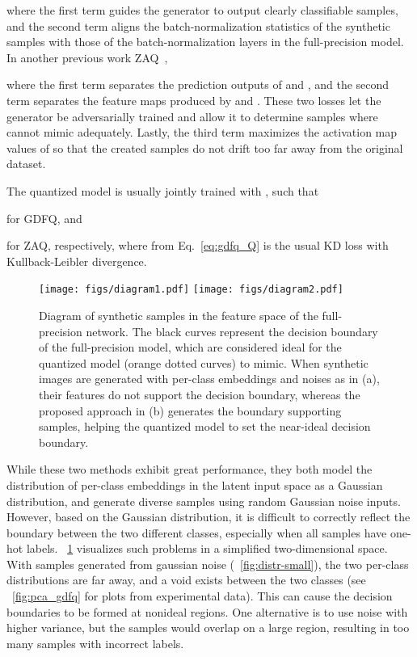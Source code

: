 \documentclass{article}
\begin{document}
where the first term  guides the generator to output clearly classifiable samples, and the second term  aligns the batch-normalization statistics of the synthetic samples with those of the batch-normalization layers in the full-precision model.
In another previous work ZAQ~\cite{zaq},  

where the first term  separates the prediction outputs of  and , and the second term  separates the feature maps produced by  and .
These two losses let the generator be adversarially trained and allow it to determine samples where  cannot mimic  adequately.
Lastly, the third term  maximizes the activation map values of  so that the created samples do not drift too far away from the original dataset. 

The quantized model  is usually jointly trained with , such that 

for GDFQ, and 

for ZAQ, respectively, where  from Eq.~\ref{eq:gdfq_Q} is the usual KD loss with Kullback-Leibler divergence.

\begin{figure}
\centering
{}
	    {\texttt{[image: figs/diagram1.pdf]}}
	    {\texttt{[image: figs/diagram2.pdf]}}
\caption{Diagram of synthetic samples in the feature space of the full-precision network. The black curves represent the decision boundary of the full-precision model, which are considered ideal for the quantized model (orange dotted curves) to mimic. When synthetic images are generated with per-class embeddings and noises as in (a), their features do not support the decision boundary, whereas the proposed approach in (b) generates the boundary supporting samples, helping the quantized model to set the near-ideal decision boundary. }
	\label{fig:distr}
\end{figure}


While these two methods exhibit great performance, they both model the distribution of per-class embeddings in the latent input space as a Gaussian distribution, 
and generate diverse samples using random Gaussian noise inputs. 
However, based on the Gaussian distribution, it is difficult to correctly reflect the boundary between the two different classes, especially when all samples have one-hot labels. 
\figurename~\ref{fig:distr} visualizes such problems in a simplified two-dimensional space. 
With samples generated from gaussian noise (\figurename~\ref{fig:distr-small}), the two per-class distributions are far away, and a void exists between the two classes (see \figurename~\ref{fig:pca_gdfq} for plots from experimental data).  
This can cause the decision boundaries to be formed at nonideal regions.
One alternative is to use noise with higher variance, but the samples would overlap on a large region, resulting in too many samples with incorrect labels.
\end{document}

